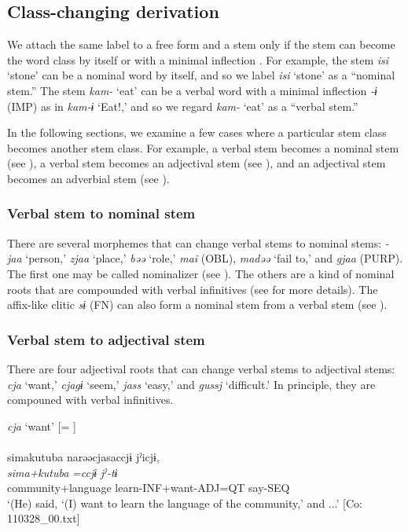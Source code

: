 \subsection{Class-changing derivation}\label{sec:4.3.8}

We attach the same label to a free form and a stem only if the stem can become the word class by itself or with a minimal inflection \citep[cf.][8]{Lehmann2008}. For example, the stem \textit{isi} ‘stone’ can be a nominal word by itself, and so we label \textit{isi} ‘stone’ as a “nominal stem.” The stem \textit{kam-} ‘eat’ can be a verbal word with a minimal inflection \textit{{}-ɨ} (IMP) as in \textit{kam-ɨ} ‘Eat!,’ and so we regard \textit{kam-} ‘eat’ as a “verbal stem.”

In the following sections, we examine a few cases where a particular stem class becomes another stem class. For example, a verbal stem becomes a nominal stem (see ), a verbal stem becomes an adjectival stem (see ), and an adjectival stem becomes an adverbial stem (see ).

\subsubsection{Verbal stem to nominal stem}\label{sec:4.3.8.1}

There are several morphemes that can change verbal stems to nominal stems: \textit{{}-jaa} ‘person,’ \textit{zjaa} ‘place,’ \textit{bəə} ‘role,’ \textit{mai} (OBL), \textit{madəə} ‘fail to,’ and \textit{gjaa} (PURP). The first one may be called nominalizer (see ). The others are a kind of nominal roots that are compounded with verbal infinitives (see  for more details). The affix-like clitic \textit{sɨ} (FN) can also form a nominal stem from a verbal stem (see ).

\subsubsection{Verbal stem to adjectival stem}\label{sec:4.3.8.2}

There are four adjectival roots that can change verbal stems to adjectival stems: \textit{cja} ‘want,’ \textit{cjagɨ} ‘seem,’ \textit{jass} ‘easy,’ and \textit{gussj} ‘difficult.’ In principle, they are compouned with verbal infinitives.

\ea \label{ex:4.59} \ea  \textit{cja} ‘want’ [= ] \label{ex:4.59a}\\\\
  \glll    simakutuba   narəəcjasaccjɨ  jˀicjɨ,\\
      \textit{sima+kutuba}  \textit{=ccjɨ}  \textit{jˀ-tɨ}\\
      community+language  learn-INF+want-ADJ=QT  say-SEQ\\
      \glt       ‘(He) said, ‘(I) want to learn the language of the community,’ and ...’ [Co: 110328\_00.txt]

